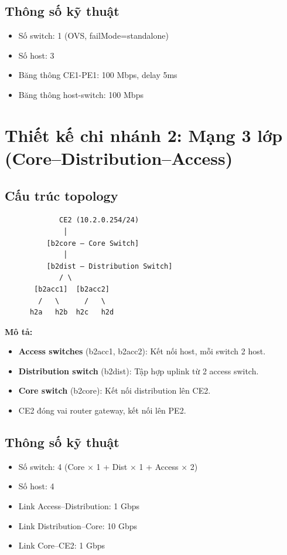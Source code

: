 \subsection{Thông số kỹ thuật}
\begin{itemize}
    \item Số switch: 1 (OVS, failMode=standalone)
    \item Số host: 3
    \item Băng thông CE1-PE1: 100 Mbps, delay 5ms
    \item Băng thông host-switch: 100 Mbps
\end{itemize}

\section{Thiết kế chi nhánh 2: Mạng 3 lớp (Core--Distribution--Access)}

\subsection{Cấu trúc topology}

\begin{verbatim}
             CE2 (10.2.0.254/24)
              │
          [b2core – Core Switch]
              │
          [b2dist – Distribution Switch]
             / \
       [b2acc1]  [b2acc2]
        /   \      /   \
      h2a   h2b  h2c   h2d
\end{verbatim}

\textbf{Mô tả:}
\begin{itemize}
    \item \textbf{Access switches} (b2acc1, b2acc2): Kết nối host, mỗi switch 2 host.
    \item \textbf{Distribution switch} (b2dist): Tập hợp uplink từ 2 access switch.
    \item \textbf{Core switch} (b2core): Kết nối distribution lên CE2.
    \item CE2 đóng vai router gateway, kết nối lên PE2.
\end{itemize}

\subsection{Thông số kỹ thuật}
\begin{itemize}
    \item Số switch: 4 (Core × 1 + Dist × 1 + Access × 2)
    \item Số host: 4
    \item Link Access–Distribution: 1 Gbps
    \item Link Distribution–Core: 10 Gbps
    \item Link Core–CE2: 1 Gbps
\end{itemize}

